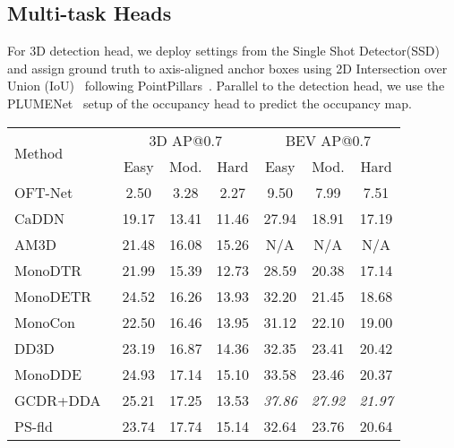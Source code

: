 \documentclass[10pt,twocolumn,letterpaper]{article}
\begin{document}
\subsection{Multi-task Heads}
For 3D detection head, we deploy settings from the Single Shot Detector(SSD)~\cite{Liu2016SSDSS} and assign ground truth to axis-aligned anchor boxes using 2D Intersection over Union (IoU)~\cite{Everingham2009ThePV} following PointPillars~\cite{Lang2019PointPillarsFE}. Parallel to the detection head, we use the PLUMENet~\cite{Wang2021PLUMENetE3} setup of the occupancy head to predict the occupancy map. 
\begin{table*}
  \centering
  \begin{tabular}{l|ccc|ccc}
    \toprule
    \multirow{2}{*}{Method} & \multicolumn{3}{c|}{3D AP@0.7} & \multicolumn{3}{c}{BEV AP@0.7}   \\
                        & Easy & Mod.  & Hard & Easy  & Mod.    & Hard  \\
    \midrule
    OFT-Net~\cite{BMVC2019}        & 2.50      & 3.28      & 2.27      & 9.50      & 7.99       & 7.51      \\
    CaDDN~\cite{reading2021categorical}           & 19.17     & 13.41     & 11.46     & 27.94     & 18.91      & 17.19     \\
    AM3D~\cite{ma2019accurate}           & 21.48     & 16.08     & 15.26     & N/A       & N/A        & N/A       \\
    MonoDTR~\cite{Huang2022MonoDTRM3}       & 21.99     & 15.39     & 12.73     & 28.59     & 20.38      & 17.14     \\
    MonoDETR~\cite{Zhang2022MonoDETRDT}      & 24.52     & 16.26     & 13.93     & 32.20     & 21.45      & 18.68     \\
    MonoCon~\cite{Liu2021LearningAM}       & 22.50     & 16.46     & 13.95     & 31.12     & 22.10      & 19.00     \\
    DD3D~\cite{Park2021IsPN}           & 23.19     & 16.87     & 14.36     & 32.35     & 23.41      & 20.42     \\
    MonoDDE~\cite{Li2022DiversityMF}       & 24.93     & 17.14     & 15.10     & 33.58     & 23.46      & 20.37     \\
    GCDR+DDA~\cite{Hu2022DeepLM}       & 25.21     & 17.25     & 13.53     & \emph{37.86}   & \emph{27.92}    & \emph{21.97}   \\
    PS-fld~\cite{Chen2022PseudoStereoFM}        & 23.74     & 17.74     & 15.14     & 32.64     & 23.76      & 20.64     \\

\end{tabular}
\end{table*}
\end{document}
